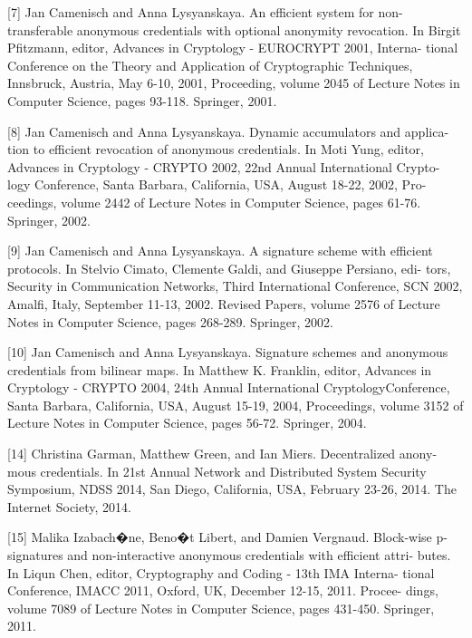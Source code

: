 [7] Jan Camenisch and Anna Lysyanskaya. An efficient system for non-
transferable anonymous credentials with optional anonymity revocation. In
Birgit Pfitzmann, editor, Advances in Cryptology - EUROCRYPT 2001, Interna-
tional Conference on the Theory and Application of Cryptographic Techniques,
Innsbruck, Austria, May 6-10, 2001, Proceeding, volume 2045 of Lecture
Notes in Computer Science, pages 93-118. Springer, 2001.

[8] Jan Camenisch and Anna Lysyanskaya. Dynamic accumulators and applica-
tion to efficient revocation of anonymous credentials. In Moti Yung, editor,
Advances in Cryptology - CRYPTO 2002, 22nd Annual International Crypto-
logy Conference, Santa Barbara, California, USA, August 18-22, 2002, Pro-
ceedings, volume 2442 of Lecture Notes in Computer Science, pages 61-76.
Springer, 2002.

[9] Jan Camenisch and Anna Lysyanskaya. A signature scheme with efficient
protocols. In Stelvio Cimato, Clemente Galdi, and Giuseppe Persiano, edi-
tors, Security in Communication Networks, Third International Conference,
SCN 2002, Amalfi, Italy, September 11-13, 2002. Revised Papers, volume
2576 of Lecture Notes in Computer Science, pages 268-289. Springer, 2002.

[10] Jan Camenisch and Anna Lysyanskaya. Signature schemes and anonymous
credentials from bilinear maps. In Matthew K. Franklin, editor, Advances in
Cryptology - CRYPTO 2004, 24th Annual International CryptologyConference,
Santa Barbara, California, USA, August 15-19, 2004, Proceedings, volume
3152 of Lecture Notes in Computer Science, pages 56-72. Springer, 2004.

[14] Christina Garman, Matthew Green, and Ian Miers. Decentralized anony-
mous credentials. In 21st Annual Network and Distributed System Security
Symposium, NDSS 2014, San Diego, California, USA, February 23-26, 2014.
The Internet Society, 2014.

[15] Malika Izabach�ne, Beno�t Libert, and Damien Vergnaud. Block-wise p-
signatures and non-interactive anonymous credentials with efficient attri-
butes. In Liqun Chen, editor, Cryptography and Coding - 13th IMA Interna-
tional Conference, IMACC 2011, Oxford, UK, December 12-15, 2011. Procee-
dings, volume 7089 of Lecture Notes in Computer Science, pages 431-450.
Springer, 2011.


\fi
